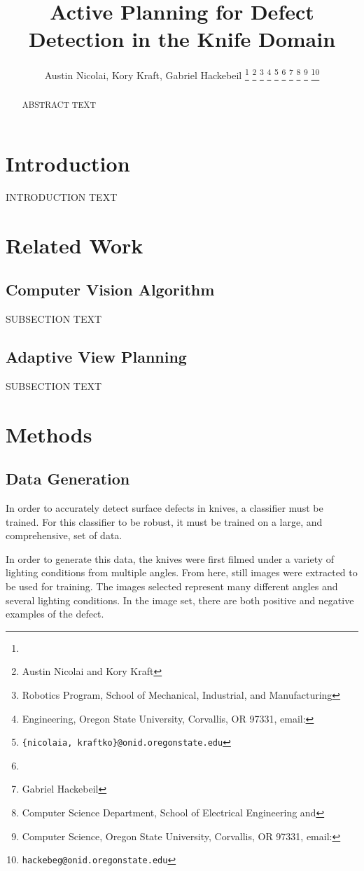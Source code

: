 \documentclass[letterpaper, 10 pt, conference]{ieeeconf}  %
\title{\LARGE \bf 
Active Planning for Defect Detection in the Knife Domain
}
\author{Austin Nicolai, Kory Kraft, Gabriel Hackebeil%
\thanks{\hrulefill}
\thanks{Austin Nicolai and Kory Kraft}
\thanks{Robotics Program, School of Mechanical, Industrial, and Manufacturing}
\thanks{Engineering, Oregon State University, Corvallis, OR 97331, email: }
\thanks{{\tt\small \{nicolaia, kraftko\}@onid.oregonstate.edu}}
\thanks{\hfill}
\thanks{Gabriel Hackebeil}
\thanks{Computer Science Department, School of Electrical Engineering and}
\thanks{Computer Science, Oregon State University, Corvallis, OR 97331, email: }
\thanks{{\tt\small hackebeg@onid.oregonstate.edu}}
}
\begin{document}
\maketitle
\thispagestyle{empty}
\pagestyle{empty}

\begin{abstract}
ABSTRACT TEXT
\end{abstract}


\section{Introduction}

INTRODUCTION TEXT\cite{placeholder}

\section{Related Work}

\subsection{Computer Vision Algorithm}

SUBSECTION TEXT

\subsection{Adaptive View Planning}

SUBSECTION TEXT

\section{Methods}

\subsection{Data Generation}

In order to accurately detect surface defects in knives, a classifier must be trained. For this classifier to be robust, it must be trained on a large, and comprehensive, set of data.

In order to generate this data, the knives were first filmed under a variety of lighting conditions from multiple angles. From here, still images were extracted to be used for training. The images selected represent many different angles and several lighting conditions. In the image set, there are both positive and negative examples of the defect.
\end{document}
